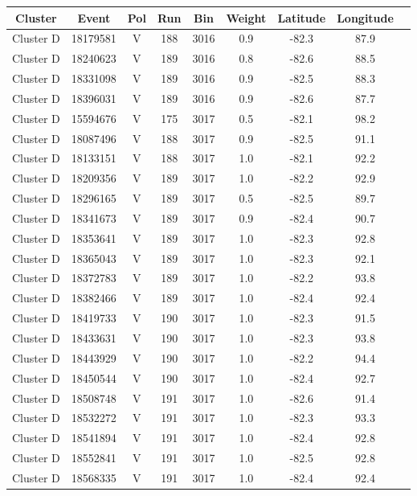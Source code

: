 \begin{table}
\centering
\begin{tabular}{ |c|c|c|c|c|c|c|c|c| } 
\hline
Cluster & Event & Pol & Run & Bin & Weight & Latitude & Longitude\\
\hline
Cluster D &	18179581 & V & 188 & 3016 & 0.9 & -82.3 & 87.9\\ 
Cluster D &	18240623 & V & 189 & 3016 & 0.8 & -82.6 & 88.5\\ 
Cluster D &	18331098 & V & 189 & 3016 & 0.9 & -82.5 & 88.3\\ 
Cluster D &	18396031 & V & 189 & 3016 & 0.9 & -82.6 & 87.7\\ 
Cluster D &	15594676 & V & 175 & 3017 & 0.5 & -82.1 & 98.2\\ 
Cluster D &	18087496 & V & 188 & 3017 & 0.9 &  -82.5 & 91.1\\ 
Cluster D &	18133151 & V & 188 & 3017 & 1.0 & -82.1 & 92.2\\ 
Cluster D &	18209356 & V & 189 & 3017 & 1.0 & -82.2 & 92.9\\ 
Cluster D &	18296165 & V & 189 & 3017 & 0.5 & -82.5 & 89.7\\ 
Cluster D &	18341673 & V & 189 & 3017 & 0.9 & -82.4 & 90.7\\ 
Cluster D &	18353641 & V & 189 & 3017 & 1.0 & -82.3 & 92.8\\ 
Cluster D &	18365043 & V & 189 & 3017 & 1.0 & -82.3 & 92.1\\ 
Cluster D &	18372783 & V & 189 & 3017 & 1.0 & -82.2 & 93.8\\ 
Cluster D &	18382466 & V & 189 & 3017 & 1.0 & -82.4 & 92.4\\ 
Cluster D &	18419733 & V & 190 & 3017 & 1.0 & -82.3 & 91.5\\ 
Cluster D &	18433631 & V & 190 & 3017 & 1.0 & -82.3 & 93.8\\ 
Cluster D &	18443929 & V & 190 & 3017 & 1.0 & -82.2 & 94.4\\ 
Cluster D &	18450544 & V & 190 & 3017 & 1.0 & -82.4 & 92.7\\ 
Cluster D &	18508748 & V & 191 & 3017 & 1.0 & -82.6 & 91.4\\ 
Cluster D &	18532272 & V & 191 & 3017 & 1.0 & -82.3 & 93.3\\ 
Cluster D &	18541894 & V & 191 & 3017 & 1.0 & -82.4 & 92.8\\ 
Cluster D &	18552841 & V & 191 & 3017 & 1.0 & -82.5 & 92.8\\ 
Cluster D &	18568335 & V & 191 & 3017 & 1.0 & -82.4 & 92.4\\ 

\end{tabular}
\end{table}
